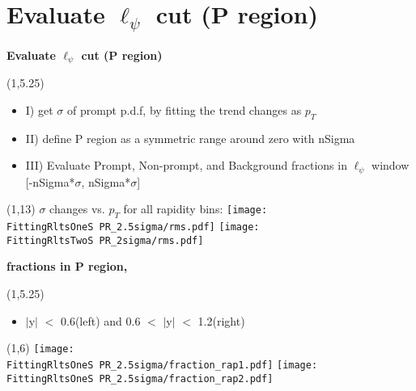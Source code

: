 \documentclass[11pt,slidescentered,red,compress,handout,hyperref={bookmarks=true},mathseriftable]{beamer}
\newcommand{\lpsi}{\ell_{\psi}}
\newcommand{\FittingRltsOneS}{../Psi1S/Fit/parameter/evaluateCtau/}
\newcommand{\FittingRltsTwoS}{../Psi2S/Fit/parameter/evaluateCtau/}
\begin{document}
%

\section{Evaluate $\lpsi$ cut (P region)} 
\begin{frame}[t]{\small \bf Evaluate $\lpsi$ cut (P region)}{}
\begin{textblock}{48}(1,5.25)
\begin{itemize}
\scriptsize \item I) get $\sigma$ of prompt p.d.f, by fitting the trend changes as $p_{T}$
\scriptsize \item II) define P region as a symmetric range around zero with nSigma
\scriptsize \item III) Evaluate Prompt, Non-prompt, and Background fractions in $\lpsi$ window [-nSigma*$\sigma$, nSigma*$\sigma$] \\
\end{itemize}
\end{textblock}
\begin{textblock}{48}(1,13)
\scriptsize $\sigma$ changes vs. $p_{T}$ for all rapidity bins: 
\hspace*{10pt} \texttt{[image: \\FittingRltsOneS PR\_2.5sigma/rms.pdf]}
\hspace*{10pt} \texttt{[image: \\FittingRltsTwoS PR\_2sigma/rms.pdf]}
\end{textblock}
\end{frame}

\begin{frame}[t]{\small \bf fractions in P region,  }{}
\begin{textblock}{48}(1,5.25)
\begin{itemize}
\scriptsize \item  $|$y$|$ $<$ 0.6(left) and 0.6 $<$ $|$y$|$ $<$ 1.2(right)
\end{itemize}
\end{textblock}
\begin{textblock}{48}(1,6)
\hspace*{10pt} \texttt{[image: \\FittingRltsOneS PR\_2.5sigma/fraction\_rap1.pdf]}
\hspace*{10pt} \texttt{[image: \\FittingRltsOneS PR\_2.5sigma/fraction\_rap2.pdf]}
\end{textblock}
\end{frame}
\end{document}
